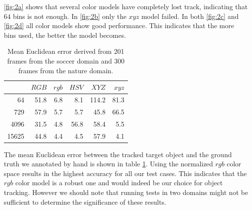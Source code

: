 \documentclass[11pt]{article}
\begin{document}
\ref{fig:2a} shows that several color models have completely lost track,
indicating that $64$ bins is not enough. In \ref{fig:2b} only the $xyz$ model failed.
In both \ref{fig:2c} and \ref{fig:2d} all color models show good performance.
This indicates that the more bins used, the better the model becomes.

\begin{table}
\centering
\begin{tabular}{r||r|r|r|r|r}
	      & $RGB$ & $rgb$ & $HSV$ & $XYZ$ & $xyz$ \\ \hline \hline
	   64 &  51.8 &   6.8 &   8.1 & 114.2 &  81.3 \\ \hline
	  729 &  57.9 &   5.7 &   5.7 &  45.8 &  66.5 \\ \hline
	 4096 &  31.5 &   4.8 &  56.8 &  58.4 &   5.5 \\ \hline
	15625 &  44.8 &   4.4 &   4.5 &  57.9 &   4.1 \\ \hline
\end{tabular}
\caption{Mean Euclidean error derived from 201 frames from the soccer domain and
300 frames from the nature domain.}
\label{tbl:error}
\end{table}

The mean Euclidean error between the tracked target object and the ground truth
we annotated by hand is shown in table \ref{tbl:error}. Using the normalized
$rgb$ color space results in the highest accuracy for all our test cases.
This indicates that the $rgb$ color model is a robust one and would indeed be
our choice for object tracking. However we should note that running tests in two
domains might not be sufficient to determine the significance of these results.
\end{document}
